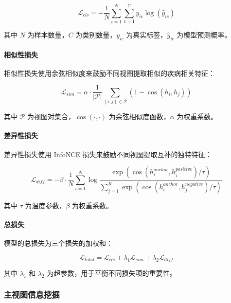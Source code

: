 \documentclass[12pt,a4paper]{article}
\begin{document}
\begin{equation}
\mathcal{L}_{cls} = -\frac{1}{N}\sum_{i=1}^{N}\sum_{c=1}^{C}y_{ic}\log(\hat{y}_{ic})
\end{equation}

其中 $N$ 为样本数量，$C$ 为类别数量，$y_{ic}$ 为真实标签，$\hat{y}_{ic}$ 为模型预测概率。

\paragraph{相似性损失}
相似性损失使用余弦相似度来鼓励不同视图提取相似的疾病相关特征：

\begin{equation}
\mathcal{L}_{sim} = \alpha \cdot \frac{1}{|\mathcal{P}|}\sum_{(i,j)\in\mathcal{P}}(1 - \cos(h_i, h_j))
\end{equation}

其中 $\mathcal{P}$ 为视图对集合，$\cos(\cdot,\cdot)$ 为余弦相似度函数，$\alpha$ 为权重系数。

\paragraph{差异性损失}
差异性损失使用 InfoNCE 损失\cite{vandenoord2018representation}来鼓励不同视图提取互补的独特特征：

\begin{equation}
\mathcal{L}_{diff} = -\beta \cdot \frac{1}{N}\sum_{i=1}^{N}\log\frac{\exp(\cos(h_i^{anchor}, h_i^{positive})/\tau)}{\sum_{j=1}^{K}\exp(\cos(h_i^{anchor}, h_j^{negative})/\tau)}
\end{equation}

其中 $\tau$ 为温度参数，$\beta$ 为权重系数。

\paragraph{总损失}
模型的总损失为三个损失的加权和：

\begin{equation}
\mathcal{L}_{total} = \mathcal{L}_{cls} + \lambda_1 \mathcal{L}_{sim} + \lambda_2 \mathcal{L}_{diff}
\end{equation}

其中 $\lambda_1$ 和 $\lambda_2$ 为超参数，用于平衡不同损失项的重要性。

\subsubsection{主视图信息挖掘}
\end{document}
